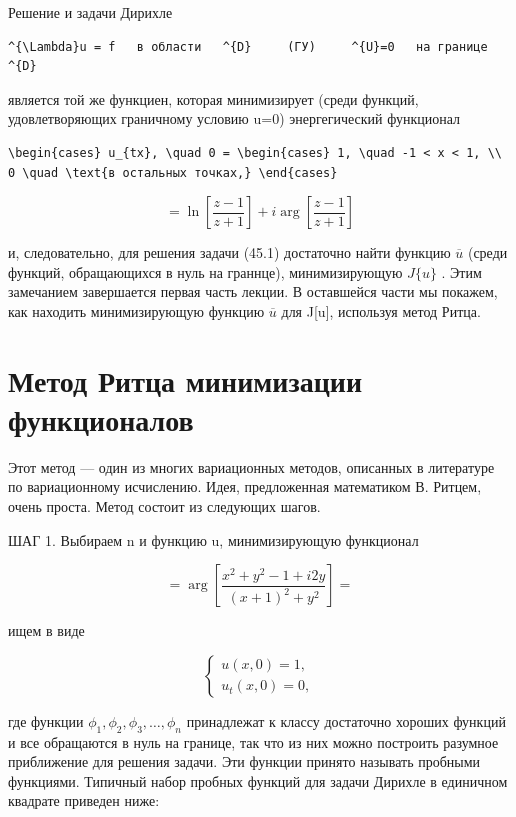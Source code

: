 \documentclass[
  ukrainian,
]{article}
\begin{document}
Решение и задачи Дирихле

\begin{verbatim}
^{\Lambda}u = f   в области   ^{D}     (ГУ)     ^{U}=0   на границе   ^{D}
\end{verbatim}

является той же функциен, которая минимизирует (среди функций,
удовлетворяющих граничному условию u=0) энергегический функционал

\begin{verbatim}
\begin{cases} u_{tx}, \quad 0 = \begin{cases} 1, \quad -1 < x < 1, \\ 0 \quad \text{в остальных точках,} \end{cases}
\end{verbatim}

\[
= \ln\left[\frac{z-1}{z+1}\right] + i \arg\left[\frac{z-1}{z+1}\right]
\]

и, следовательно, для решения задачи (45.1) достаточно найти функцию
\(\overline{u}\) (среди функций, обращающихся в нуль на граннце),
минимизирующую \(J\{u\}\) . Этим замечанием завершается первая часть
лекции. В оставшейся части мы покажем, как находить минимизирующую
функцию \(\overline{u}\) для J{[}u{]}, используя метод Ритца.

\section{Метод Ритца минимизации
функционалов}\label{ux43cux435ux442ux43eux434-ux440ux438ux442ux446ux430-ux43cux438ux43dux438ux43cux438ux437ux430ux446ux438ux438-ux444ux443ux43dux43aux446ux438ux43eux43dux430ux43bux43eux432}

Этот метод --- один из многих вариационных методов, описанных в
литературе по вариационному исчислению. Идея, предложенная математиком
В. Ритцем, очень проста. Метод состоит из следующих шагов.

ШАГ 1. Выбираем n и функцию u, минимизирующую функционал

\[
= \arg\left[\frac{x^2+y^2-1+i2y}{(x+1)^2+y^2}\right] =
\]

ищем в виде

\[
\begin{cases} u(x, 0) = 1, \\ u_t(x, 0) = 0, \end{cases}
\]

где функции \(\phi_1, \phi_2, \phi_3, \ldots, \phi_n\) принадлежат к
классу достаточно хороших функций и все обращаются в нуль на границе,
так что из них можно построить разумное приближение для решения задачи.
Эти функции принято называть пробными функциями. Типичный набор пробных
функций для задачи Дирихле в единичном квадрате приведен ниже:
\end{document}
